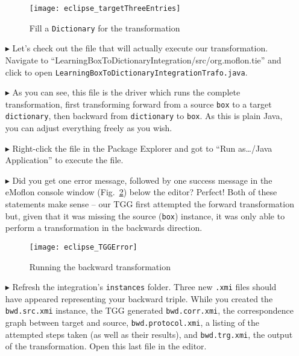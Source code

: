 \begin{itemize}
\vspace{0.5cm}

\begin{figure}[htbp]
\begin{center}
  \texttt{[image: eclipse\_targetThreeEntries]}
  \caption{Fill a \texttt{Dictionary} for the transformation}
  \label{eclipse:dictionaryxmi}
\end{center}
\end{figure}

\item[$\blacktriangleright$] Let's check out the file that will actually execute our transformation. Navigate to
``LearningBox\-To\-Dictionary\-In\-te\-gra\-tion\-/\-src/\-org.\-mof\-lon.\-tie'' and click to open
\texttt{Learn\-ing\-Box\-To\-Dict\-ion\-ary\-Int\-e\-grat\-ion\-Trafo.\-java}.

\item[$\blacktriangleright$] As you can see, this file is the driver which runs the complete transformation, first transforming forward from a source
\texttt{box} to a target \texttt{dictionary}, then backward from \texttt{dictionary} to \texttt{box}. As this is plain Java, you can adjust everything freely as
you wish.

\item[$\blacktriangleright$] Right-click the file in the Package Explorer and got to ``Run as\ldots/Java Application'' to execute the file.

\item[$\blacktriangleright$] Did you get one error message, followed by one success message in the eMoflon console window (Fig.~\ref{eclipse:tggERROR}) below
the editor? Perfect! Both of these statements make sense -- our TGG first attempted the forward transformation but, given that it was missing the source
(\texttt{box}) instance, it was only able to perform a transformation in the backwards direction.

\vspace{0.5cm}

\begin{figure}[htbp]
\begin{center}
  \texttt{[image: eclipse\_TGGError]}
  \caption{Running the backward transformation}
  \label{eclipse:tggERROR}
\end{center}
\end{figure}

\vspace{-0.5cm}

\item[$\blacktriangleright$] Refresh the integration's \texttt{instances} folder. Three new \texttt{.xmi} files should have appeared representing your backward
triple. While you created the \texttt{bwd.src.xmi} instance, the TGG generated \texttt{bwd.corr.xmi}, the correspondence graph between target and source,
\texttt{bwd.protocol.xmi}, a listing of the attempted steps taken (as well as their results), and \texttt{bwd.trg.xmi}, the output of the transformation. Open
this last file in the editor.


\end{itemize}
